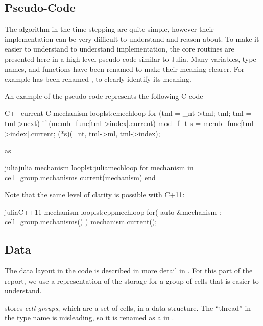 \subsection{Pseudo-Code}
The algorithm in the time stepping are quite simple, however their implementation can be very difficult to understand and reason about. To make it easier to understand to understand implementation, the core routines are presented here in a high-level pseudo code similar to Julia. Many variables, type names, and functions have been renamed to make their meaning clearer. For example  has been renamed , to clearly identify its meaning.

An example of the pseudo code represents the following C code
\begin{inlinelisting}{C++}{current C mechanism loop}{lst:cmechloop}
for (tml = _nt->tml; tml; tml = tml->next)
  if (memb_func[tml->index].current) {
    mod_f_t s = memb_func[tml->index].current;
    (*s)(_nt, tml->ml, tml->index);
  }
\end{inlinelisting}
\noindent as
\begin{inlinelisting}{julia}{julia mechanism loop}{lst:juliamechloop}
for mechanism in cell_group.mechanisms
  current(mechanism)
end
\end{inlinelisting}

\noindent Note that the same level of clarity is possible with C+11:
\begin{inlinelisting}{julia}{C++11 mechanism loop}{lst:cppmechloop}
for( auto &mechanism : cell_group.mechanisms() ) {
  mechanism.current();
}
\end{inlinelisting}

\subsection{Data}
The data layout in the \neuron code is described in more detail in . For this part of the report, we use a representation of the storage for a group of cells that is easier to understand.

\neuron stores \emph{cell groups}, which are a set of cells, in a  data structure. The ``thread'' in the type name is misleading, so it is renamed as a  in .

